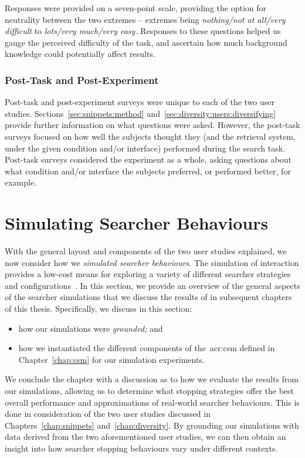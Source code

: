 Responses were provided on a seven-point scale, providing the option for neutrality between the two extremes -- extremes being \emph{nothing/not at all/very difficult} to \emph{lots/very much/very easy.} Responses to these questions helped us gauge the perceived difficulty of the task, and ascertain how much background knowledge could potentially affect results.

\subsubsection{Post-Task and Post-Experiment}
Post-task and post-experiment surveys were unique to each of the two user studies. Sections~\ref{sec:snippets:method} and~\ref{sec:diversity:users:diversifying} provide further information on what questions were asked. However, the post-task surveys focused on how well the subjects thought they (and the retrieval system, under the given condition and/or interface) performed during the search task. Post-task surveys considered the experiment as a whole, asking questions about what condition and/or interface the subjects preferred, or performed better, for example.

\section{Simulating Searcher Behaviours}\label{sec:method:simulation}
With the general layout and components of the two user studies explained, we now consider how we \emph{simulated searcher behaviours.} The simulation of interaction provides a low-cost means for exploring a variety of different searcher strategies and configurations~\citep{azzopardi2010workshop}. In this section, we provide an overview of the general aspects of the  searcher simulations that we discuss the results of in subsequent chapters of this thesis. Specifically, we discuss in this section:

\begin{itemize}
    \item{how our simulations were \emph{grounded;} and}
    \item{how we instantiated the different components of the~\gls{acr:csm} defined in Chapter~\ref{chap:csm} for our simulation experiments.}
\end{itemize}

We conclude the chapter with a discussion as to how we evaluate the results from our simulations, allowing us to determine what stopping strategies offer the best overall performance and approximations of real-world searcher behaviours. This is done in consideration of the two user studies discussed in Chapters~\ref{chap:snippets} and~\ref{chap:diversity}. By grounding our simulations with data derived from the two aforementioned user studies, we can then obtain an insight into how searcher stopping behaviours vary under different contexts.

